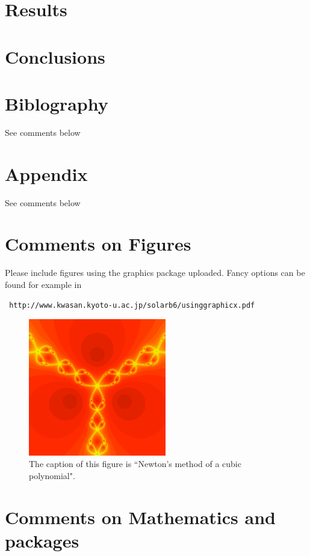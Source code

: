 \documentclass[12,twoside]{TFG-GCED}
\begin{document}
\section{Results}

\section{Conclusions}

\section*{Biblography}

See comments below
\section*{Appendix}

See comments below



\section*{Comments on Figures}

Please include figures using the graphics package uploaded.  Fancy options can be found for example in  \begin{verbatim} http://www.kwasan.kyoto-u.ac.jp/solarb6/usinggraphicx.pdf \end{verbatim}

\begin{figure}[htb!]
\begin{center}
\includegraphics[width=6cm]{samplefigure.pdf}
\end{center}
\caption{\label{sample figure} \small The caption of this figure is ``Newton's method of a cubic polynomial".}
\end{figure}

\section*{ Comments on Mathematics and packages} \label{packages}
\end{document}
